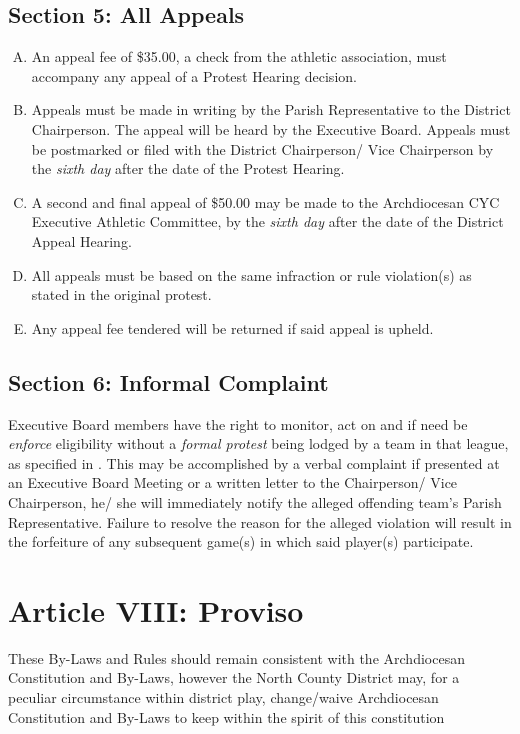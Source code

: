 \subsection{Section 5: All Appeals}
\label{ssec:const-7-5}
\begin{enumerate}[A.]
    \item An appeal fee of \$35.00, a check from the athletic association, must accompany any appeal of a Protest Hearing decision.
    \item Appeals must be made in writing by the Parish Representative to the District Chairperson.  The appeal will be heard by the Executive Board.  Appeals must be postmarked or filed with the District Chairperson/ Vice Chairperson by the {\em sixth day} after the date of the Protest Hearing.
    \item A second and final appeal of \$50.00 may be made to the Archdiocesan CYC Executive Athletic Committee, by the {\em sixth day} after the date of the District Appeal Hearing.
    \item All appeals must be based on the same infraction or rule violation(s) as stated in the original protest.
    \item Any appeal fee tendered will be returned if said appeal is upheld.
\end{enumerate}

\subsection{Section 6: Informal Complaint}
\label{ssec:const-7-6}
Executive Board members have the right to monitor, act on and if need be {\em enforce} eligibility without a {\em formal protest} being lodged by a team in that league, as specified in .  This may be accomplished by a verbal complaint if presented at an Executive Board Meeting or a written letter to the Chairperson/ Vice Chairperson, he/ she will immediately notify the alleged offending team's Parish Representative.  Failure to resolve the reason for the alleged violation will result in the forfeiture of any subsequent game(s) in which said player(s) participate.

\section{Article VIII: Proviso}
\label{sec:const-8}
These By-Laws and Rules should remain consistent with the Archdiocesan Constitution and By-Laws, however the North County District may, for a peculiar circumstance within district play, change/waive Archdiocesan Constitution and By-Laws to keep within the spirit of this constitution

